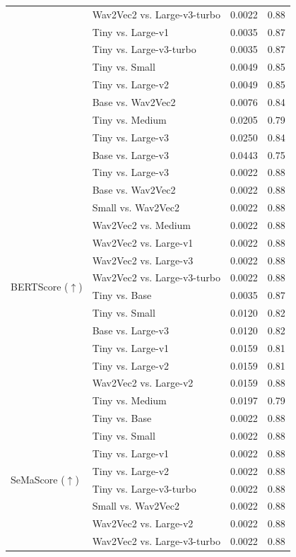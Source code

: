 \begin{table}[!t]
\begin{minipage}[t]{0.49\textwidth}
\begin{tabular}{@{}l l c c@{}}
 & Wav2Vec2 vs. Large-v3-turbo & 0.0022 & 0.88 \\
 & Tiny vs. Large-v1 & 0.0035 & 0.87 \\
 & Tiny vs. Large-v3-turbo & 0.0035 & 0.87 \\
 & Tiny vs. Small & 0.0049 & 0.85 \\
 & Tiny vs. Large-v2 & 0.0049 & 0.85 \\
 & Base vs. Wav2Vec2 & 0.0076 & 0.84 \\
 & Tiny vs. Medium & 0.0205 & 0.79 \\
 & Tiny vs. Large-v3 & 0.0250 & 0.84 \\
 & Base vs. Large-v3 & 0.0443 & 0.75 \\
\midrule
\multirow{14}{*}{BERTScore ($\uparrow$)}
 & Tiny vs. Large-v3 & 0.0022 & 0.88 \\
 & Base vs. Wav2Vec2 & 0.0022 & 0.88 \\
 & Small vs. Wav2Vec2 & 0.0022 & 0.88 \\
 & Wav2Vec2 vs. Medium & 0.0022 & 0.88 \\
 & Wav2Vec2 vs. Large-v1 & 0.0022 & 0.88 \\
 & Wav2Vec2 vs. Large-v3 & 0.0022 & 0.88 \\
 & Wav2Vec2 vs. Large-v3-turbo & 0.0022 & 0.88 \\
 & Tiny vs. Base & 0.0035 & 0.87 \\
 & Tiny vs. Small & 0.0120 & 0.82 \\
 & Base vs. Large-v3 & 0.0120 & 0.82 \\
 & Tiny vs. Large-v1 & 0.0159 & 0.81 \\
 & Tiny vs. Large-v2 & 0.0159 & 0.81 \\
 & Wav2Vec2 vs. Large-v2 & 0.0159 & 0.88 \\
 & Tiny vs. Medium & 0.0197 & 0.79 \\
\midrule
\multirow{18}{*}{SeMaScore ($\uparrow$)}
 & Tiny vs. Base & 0.0022 & 0.88 \\
 & Tiny vs. Small & 0.0022 & 0.88 \\
 & Tiny vs. Large-v1 & 0.0022 & 0.88 \\
 & Tiny vs. Large-v2 & 0.0022 & 0.88 \\
 & Tiny vs. Large-v3-turbo & 0.0022 & 0.88 \\
 & Small vs. Wav2Vec2 & 0.0022 & 0.88 \\
 & Wav2Vec2 vs. Large-v2 & 0.0022 & 0.88 \\
 & Wav2Vec2 vs. Large-v3-turbo & 0.0022 & 0.88 \\

\end{tabular}
\end{minipage}
\end{table}
